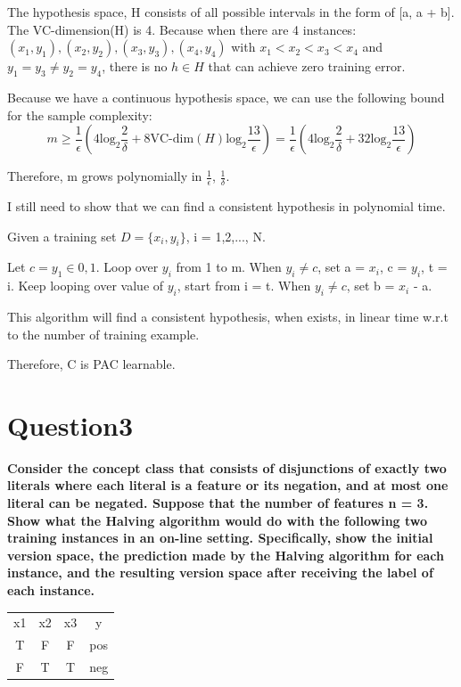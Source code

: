 \documentclass[paper=a4, fontsize=11pt]{scrartcl} %
\numberwithin{equation}{section} %
\numberwithin{figure}{section} %
\numberwithin{table}{section} %
\begin{document}
The hypothesis space, H consists of all possible intervals in the form of [a, a + b]. The VC-dimension(H) is 4. Because when there are 4 instances: $(x_1,y_1),(x_2,y_2),(x_3,y_3),(x_4,y_4)$ with $x_1< x_2< x_3< x_4$ and $y_1 = y_3 \neq y_2 = y_4$, there is no $h \in H$ that can achieve zero training error. 

Because we have a continuous hypothesis space, we can use the following bound for the sample complexity: 
$$
m \geq \frac{1}{\epsilon} (4 \text{log}_2 \frac{2}{\delta} + 8 \text{VC-dim}(H) \text{log}_2 \frac{13}{\epsilon}) = \frac{1}{\epsilon} (4 \text{log}_2 \frac{2}{\delta} + 32 \text{log}_2 \frac{13}{\epsilon})
$$

Therefore, m grows polynomially in $\frac{1}{\epsilon}$, $\frac{1}{\delta}$. 

\bigbreak
I still need to show that we can find a consistent hypothesis in polynomial time. 

Given a training set $D = \{x_i,y_i\}$, i = 1,2,..., N. 

Let $c = y_1 \in {0,1}$. Loop over $y_i$ from 1 to m. When $y_i \neq c$, set a = $x_i$, c = $y_i$, t = i. Keep looping over value of $y_i$, start from i = t. When $y_i \neq c$, set b = $x_i$ - a. 

This algorithm will find a consistent hypothesis, when exists, in linear time w.r.t to the number of training example.  

\bigbreak 
Therefore, C is PAC learnable. 

\newpage
\section*{Question3}
\textbf{Consider the concept class that consists of disjunctions of exactly two literals where each literal is a feature or its negation, and at most one literal can be negated. Suppose that the number of features n = 3. Show what the Halving algorithm would do with the following two training instances in an on-line setting. Specifically, show the initial version space, the prediction made by the Halving algorithm for each instance, and the resulting version space after receiving the label of each instance.}

\begin{center}
\begin{tabular}{ c c c c}
 x1 & x2 & x3 & y \\ 
 T & F & F & pos \\  
 F & T & T & neg \\  
\end{tabular}
\end{center}
\end{document}
